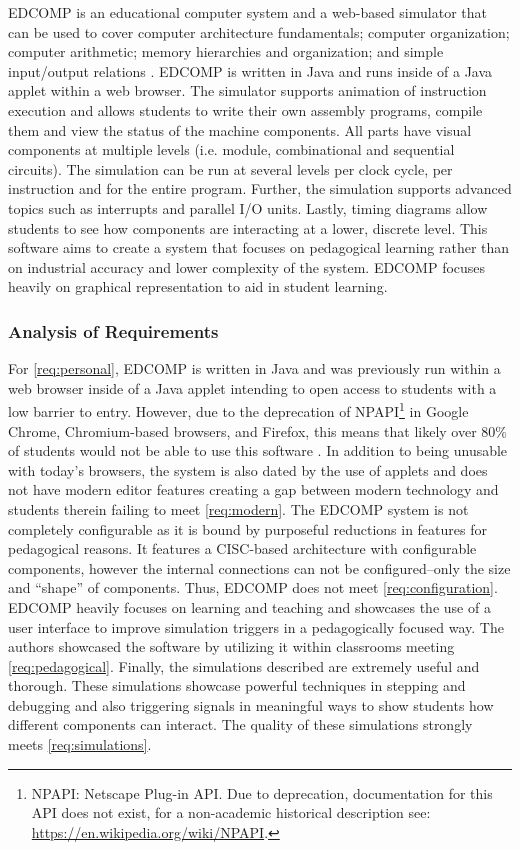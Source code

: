 EDCOMP is an educational computer system and a web-based simulator that can be used to cover computer architecture fundamentals; computer organization; computer arithmetic; memory hierarchies and organization; and simple input/output relations \cite{Djordjevic2005}. EDCOMP is written in Java and runs inside of a Java applet within a web browser. The simulator supports animation of instruction execution and allows students to write their own assembly programs, compile them and view the status of the machine components. All parts have visual components at multiple levels (i.e. module, combinational and sequential circuits). The simulation can be run at several levels per clock cycle, per instruction and for the entire program. Further, the simulation supports advanced topics such as interrupts and parallel I/O units. Lastly, timing diagrams allow students to see how components are interacting at a lower, discrete level. This software aims to create a system that focuses on pedagogical learning rather than on industrial accuracy and lower complexity of the system. EDCOMP focuses heavily on graphical representation to aid in student learning.

\subsubsection*{Analysis of Requirements}

For \cref{req:personal}, EDCOMP is written in Java and was previously run within a web browser inside of a Java applet intending to open access to students with a low barrier to entry. However, due to the deprecation of NPAPI\footnote{NPAPI: Netscape Plug-in API. Due to deprecation, documentation for this API does not exist, for a non-academic historical description see: \url{https://en.wikipedia.org/wiki/NPAPI}.} in Google Chrome, Chromium-based browsers, and Firefox, this means that likely over 80\% of students would not be able to use this software \cite{StatCounterBrowsers2017, W3SchoolsBrowsers2017, OracleJavaApplet2017, ChromiumBlogNPAPI2013, MozillaBlogNPAPI2016, GoogleChromeHelp2015}. In addition to being unusable with today's browsers, the system is also dated by the use of applets and does not have modern editor features creating a gap between modern technology and students therein failing to meet \cref{req:modern}. The EDCOMP system is not completely configurable as it is bound by purposeful reductions in features for pedagogical reasons. It features a CISC-based architecture with configurable components, however the internal connections can not be configured--only the size and ``shape'' of components. Thus, EDCOMP does not meet \cref{req:configuration}. EDCOMP heavily focuses on learning and teaching and showcases the use of a user interface to improve simulation triggers in a pedagogically focused way. The authors showcased the software by utilizing it within classrooms meeting \cref{req:pedagogical}. Finally, the simulations described are extremely useful and thorough. These simulations showcase powerful techniques in stepping and debugging and also triggering signals in meaningful ways to show students how different components can interact. The quality of these simulations strongly meets \cref{req:simulations}. 

